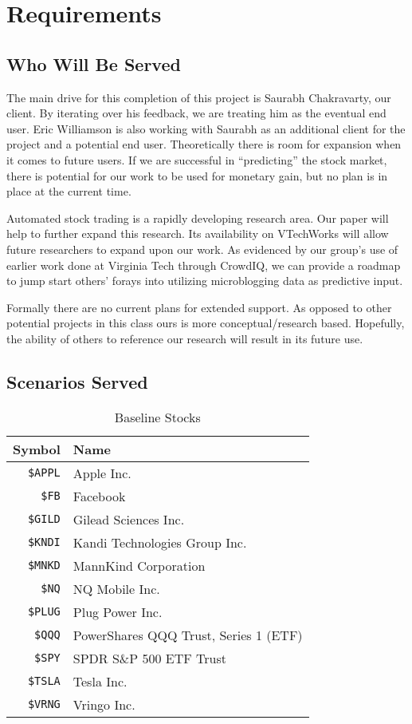 
\section{Requirements}

\subsection{Who Will Be Served}

The main drive for this completion of this project is Saurabh Chakravarty, our client.
By iterating over his feedback, we are treating him as the eventual end user.
Eric Williamson is also working with Saurabh as an additional client for the project and a potential end user.
Theoretically there is room for expansion when it comes to future users.
If we are successful in “predicting” the stock market, there is potential for our work to be used for monetary gain, but no plan is in place at the current time. 

Automated stock trading is a rapidly developing research area.
Our paper will help to further expand this research.
Its availability on VTechWorks will allow future researchers to expand upon our work.
As evidenced by our group's use of earlier work done at Virginia Tech through CrowdIQ, we can provide a roadmap to jump start others' forays into utilizing microblogging data as predictive input.

Formally there are no current plans for extended support.
As opposed to other potential projects in this class ours is more conceptual/research based.
Hopefully, the ability of others to reference our research will result in its future use.

\subsection{Scenarios Served}

\begin{table}
  \centering
  \begin{tabular}{ | r | l | }
    \hline
    Symbol & Name \\ \hline
    \texttt{\$APPL} & Apple Inc. \\ \hline
    \texttt{\$FB} & Facebook \\ \hline
    \texttt{\$GILD} & Gilead Sciences Inc. \\ \hline
    \texttt{\$KNDI} & Kandi Technologies Group Inc. \\ \hline
    \texttt{\$MNKD} & MannKind Corporation \\ \hline
    \texttt{\$NQ} & NQ Mobile Inc. \\\hline
    \texttt{\$PLUG} & Plug Power Inc. \\\hline
    \texttt{\$QQQ} & PowerShares QQQ Trust, Series 1 (ETF) \\\hline
    \texttt{\$SPY} & SPDR S\&P 500 ETF Trust \\\hline
    \texttt{\$TSLA} & Tesla Inc. \\\hline
    \texttt{\$VRNG} & Vringo Inc. \\\hline
  \end{tabular}
  \caption{Baseline Stocks}\label{tab:stocks}
\end{table}

